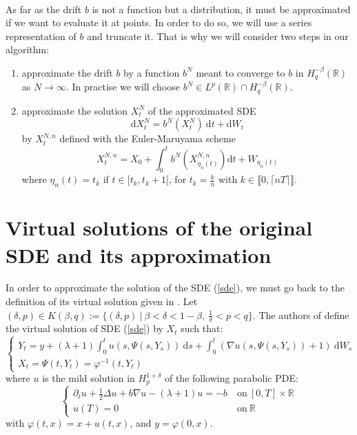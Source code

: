\documentclass[11pt]{enstaPRE}
\newcommand{\R}{\mathbb{R}}
\newcommand{\di}{\mathrm{d}}
\begin{document}
    \paragraph{}
    As far as the drift $b$ is not a function but a distribution, it must be approximated if we want to evaluate it at points. In order to do so, we will use a series representation of $b$ and truncate it. That is why we will consider two steps in our algorithm: \begin{enumerate}
        \item approximate the drift $b$ by a function $b^N$ meant to converge to $b$ in $H^{-\beta}_q(\R)$ as $N\rightarrow\infty$. In practise we will choose $b^N\in L^p(\R)\cap H^{-\beta}_q(\R)$.
        \item approximate the solution $X^N_t$ of the approximated SDE
        \begin{equation} \label{sde2}
        \di X^N_t = b^N\left(X^N_t\right)\ \di t + \di W_t
        \end{equation} 
        by $X^{N,n}_t$ defined with the Euler-Maruyama scheme
        \begin{equation*}
        X^{N,n}_t = X_0 + \int_0^t b^N\left(X^{N,n}_{\eta_n(t)}\right)\di t + W_{\eta_n(t)}
        \end{equation*}
        where $\eta_n(t)=t_k$ if $t\in[t_k,t_k+1[$, for $t_k=\frac{k}{n}$ with $ k\in\llbracket0,\lceil nT\rceil\rrbracket$.
        
    \end{enumerate}

\section{Virtual solutions of the original SDE and its approximation}

In order to approximate the solution of the SDE (\ref{sde}), we must go back to the definition of its virtual solution given in \cite{Fla-Iss-Rus-2017}. Let $(\delta,p)\in K(\beta,q):=\{(\delta,p)\ |\ \beta<\delta<1-\beta,\ \frac{1}{\delta}<p<q\}$. The authors of \cite{Fla-Iss-Rus-2017} define the virtual solution of SDE (\ref{sde}) by $X_t$ such that:
\begin{equation}\label{virtual}
\begin{cases}
Y_t = y + (\lambda+1)\int_0^t u(s,\Psi\left(s,Y_s\right))\ \di s +\int_0^t (\nabla u(s,\Psi\left(s,Y_s\right))+1)\ \di W_s \\X_t = \Psi(t,Y_t) = \varphi^{-1}(t,Y_t)
\end{cases}
\end{equation}
where $u$ is the mild solution in $H_p^{1+\delta}$ of the following parabolic PDE:
\begin{equation}\label{pde}
\begin{cases}
\partial_t u + \frac{1}{2}\Delta u + b\nabla u - (\lambda+1)u = -b\ &\mathrm{on}\ [0,T]\times\R\\
u(T) = 0\ &\mathrm{on}\ \R
\end{cases}
\end{equation}
with $\varphi(t,x) = x + u(t,x)$, and $y=\varphi(0,x)$.
\end{document}
